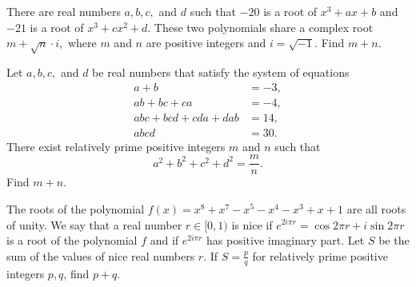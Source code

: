 \documentclass[11pt]{article}
\theoremstyle{definition}
\begin{document}
%	













\begin{question}[name={2021 AIME II, \href{https://artofproblemsolving.com/community/c4p21026751}{Problem 4}}]
	There are real numbers $a, b, c, $ and $d$ such that $-20$ is a root of $x^3 + ax + b$ and $-21$ is a root of $x^3 + cx^2 + d.$ These two polynomials share a complex root $m + \sqrt{n} \cdot i, $ where $m$ and $n$ are positive integers and $i = \sqrt{-1}.$ Find $m+n$.
\end{question}


%	







\begin{question}[name={2021 AIME II, \href{https://artofproblemsolving.com/community/c4p21027050}{Problem 7}}]
	Let $a, b, c,$ and $d$ be real numbers that satisfy the system of equations
	\begin{align*}
		a+b&=-3,\\
		ab+bc+ca&= -4,\\
		abc+bcd+cda+dab&=14,\\
		abcd&=30.
	\end{align*}
	There exist relatively prime positive integers $m$ and $n$ such that $$a^2 + b^2 + c^2 + d^2 = \frac{m}{n}.$$
	Find $m + n$.
\end{question}


%	









\begin{question}[name={2021 PUMaC, Team Round, \href{https://artofproblemsolving.com/community/c4p24986117}{Problem 7}}]
	The roots of the polynomial $f(x) = x^8 +x^7 -x^5 -x^4 -x^3 +x+ 1 $ are all roots of unity. We say that a real number $r \in [0, 1)$ is nice if $e^{2i \pi r} = \cos 2\pi r + i \sin 2\pi r$ is a root of the polynomial $f$ and if $e^{2i \pi r}$ has positive imaginary part. Let $S$ be the sum of the values of nice real numbers $r$. If $S =\frac{p}{q}$ for relatively prime positive integers $p, q$, find $p + q$.	
\end{question}
\end{document}
